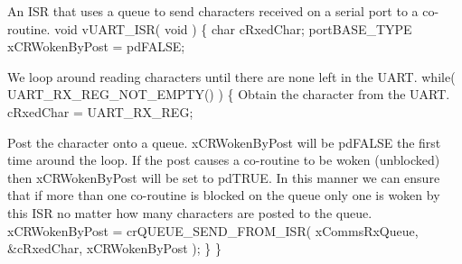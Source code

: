 \begin{DoxyPre}An ISR that uses a queue to send characters received on a serial port to
a co-routine.
 void vUART\_ISR( void )
 \{
 char cRxedChar;
 portBASE\_TYPE xCRWokenByPost = pdFALSE;\end{DoxyPre}



\begin{DoxyPre}We loop around reading characters until there are none left in the UART.
     while( UART\_RX\_REG\_NOT\_EMPTY() )
     \{
Obtain the character from the UART.
         cRxedChar = UART\_RX\_REG;\end{DoxyPre}



\begin{DoxyPre}Post the character onto a queue.  xCRWokenByPost will be pdFALSE
the first time around the loop.  If the post causes a co-routine
to be woken (unblocked) then xCRWokenByPost will be set to pdTRUE.
In this manner we can ensure that if more than one co-routine is
blocked on the queue only one is woken by this ISR no matter how
many characters are posted to the queue.
         xCRWokenByPost = crQUEUE\_SEND\_FROM\_ISR( xCommsRxQueue, &cRxedChar, xCRWokenByPost );
     \}
 \}\end{DoxyPre}
 